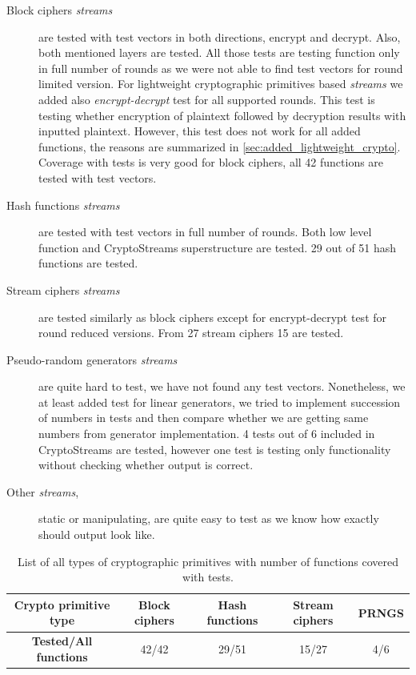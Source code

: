 \documentclass[
    digital,    %
    oneside,    %
    color,
    11pt,
    nocover,
    notable,
    nolof,
    nolot,
    final
]{fithesis3}
\begin{document}
\begin{description}
	\item[Block ciphers \textit{streams}] are tested with test vectors in both directions, encrypt and decrypt. Also, both mentioned layers are tested. All those tests are testing function only in full number of rounds as we were not able to find test vectors for round limited version. For lightweight cryptographic primitives based \textit{streams} we added also \textit{encrypt-decrypt} test for all supported rounds. This test is testing whether encryption of plaintext followed by decryption results with inputted plaintext. However, this test does not work for all added functions, the reasons are summarized in \cref{sec:added_lightweight_crypto}. Coverage with tests is very good for block ciphers, all 42 functions are tested with test vectors.
	
	\item[Hash functions \textit{streams}] are tested with test vectors in full number of rounds. Both low level function and CryptoStreams superstructure are tested. 29 out of 51 hash functions are tested.
	
	\item[Stream ciphers \textit{streams}] are tested similarly as block ciphers except for encrypt-decrypt test for round reduced versions. From 27 stream ciphers 15 are tested.
	
	\item[Pseudo-random generators \textit{streams}] are quite hard to test, we have not found any test vectors. Nonetheless, we at least added test for linear generators, we tried to implement succession of numbers in tests and then compare whether we are getting same numbers from generator implementation. 4 tests out of 6 included in CryptoStreams are tested, however one test is testing only functionality without checking whether output is correct. 
	
	\item[Other \textit{streams},] static or manipulating, are quite easy to test as we know how exactly should output look like.
	 
\end{description}
\begin{table}[t]
	\centering	
	\begin{tabular}{c|c c c c}
		\textbf{\large Crypto primitive type} &  Block ciphers &  Hash functions &  Stream ciphers &  PRNGS  \\ \hline
		\textbf{\large Tested/All functions} & 42/42	&	29/51		&		15/27	&		4/6	\\
		
	\end{tabular}
	\caption{List of all types of cryptographic primitives with number of functions covered with tests.}
	\label{table:tested-cryptoprimitives}
\end{table}
\end{document}
